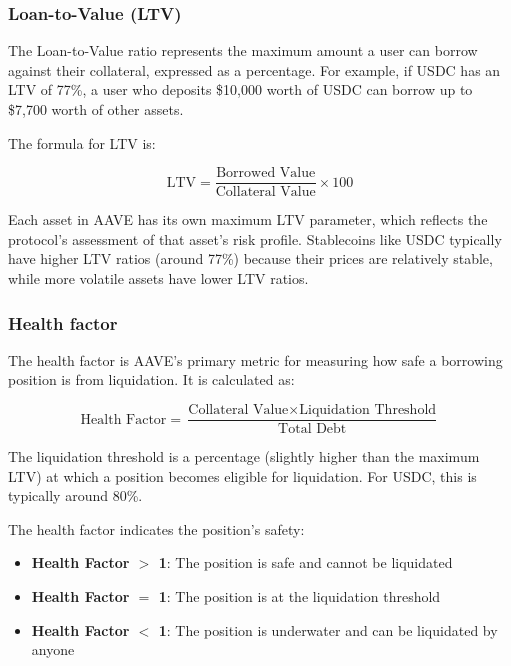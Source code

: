 \subsubsection{Loan-to-Value (LTV)}

The Loan-to-Value ratio represents the maximum amount a user can borrow against their collateral, expressed as a percentage. For example, if USDC has an LTV of 77\%, a user who deposits \$10,000 worth of USDC can borrow up to \$7,700 worth of other assets.

The formula for LTV is:

\begin{equation}
\text{LTV} = \frac{\text{Borrowed Value}}{\text{Collateral Value}} \times 100
\end{equation}

Each asset in AAVE has its own maximum LTV parameter, which reflects the protocol's assessment of that asset's risk profile. Stablecoins like USDC typically have higher LTV ratios (around 77\%) because their prices are relatively stable, while more volatile assets have lower LTV ratios.

\subsubsection{Health factor}

The health factor is AAVE's primary metric for measuring how safe a borrowing position is from liquidation. It is calculated as:

\begin{equation}
\text{Health Factor} = \frac{\text{Collateral Value} \times \text{Liquidation Threshold}}{\text{Total Debt}}
\end{equation}

The liquidation threshold is a percentage (slightly higher than the maximum LTV) at which a position becomes eligible for liquidation. For USDC, this is typically around 80\%.

The health factor indicates the position's safety:
\begin{itemize}
    \item \textbf{Health Factor $>$ 1}: The position is safe and cannot be liquidated
    \item \textbf{Health Factor $=$ 1}: The position is at the liquidation threshold
    \item \textbf{Health Factor $<$ 1}: The position is underwater and can be liquidated by anyone
\end{itemize}


